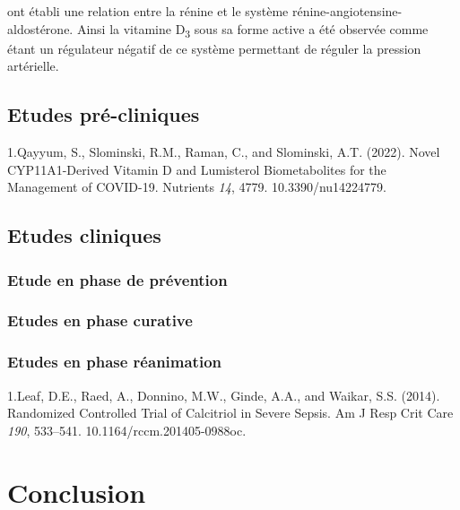 \documentclass[
  a4paper,
  DIV=11,
  numbers=noendperiod,
  listof=totoc]{scrreprt}
\begin{document}
\textcite{Li.2002} ont établi une relation entre la rénine et le système
rénine-angiotensine-aldostérone. Ainsi la vitamine D\textsubscript{3}
sous sa forme active a été observée comme étant un régulateur négatif de
ce système permettant de réguler la pression artérielle.

\hypertarget{etudes-pruxe9-cliniques}{%
\section{Etudes pré-cliniques}\label{etudes-pruxe9-cliniques}}

1.Qayyum, S., Slominski, R.M., Raman, C., and Slominski, A.T. (2022).
Novel CYP11A1-Derived Vitamin D and Lumisterol Biometabolites for the
Management of COVID-19. Nutrients \emph{14}, 4779. 10.3390/nu14224779.

\hypertarget{etudes-cliniques}{%
\section{Etudes cliniques}\label{etudes-cliniques}}

\hypertarget{etude-en-phase-de-pruxe9vention}{%
\subsection{Etude en phase de
prévention}\label{etude-en-phase-de-pruxe9vention}}

\hypertarget{etudes-en-phase-curative}{%
\subsection{Etudes en phase curative}\label{etudes-en-phase-curative}}

\hypertarget{etudes-en-phase-ruxe9animation}{%
\subsection{Etudes en phase
réanimation}\label{etudes-en-phase-ruxe9animation}}

1.Leaf, D.E., Raed, A., Donnino, M.W., Ginde, A.A., and Waikar, S.S.
(2014). Randomized Controlled Trial of Calcitriol in Severe Sepsis. Am J
Resp Crit Care \emph{190}, 533--541. 10.1164/rccm.201405-0988oc.

\newpage{}

\hypertarget{conclusion}{%
\chapter{Conclusion}\label{conclusion}}

\newpage{}


\printbibliography[title=Bibliographie]
\end{document}

